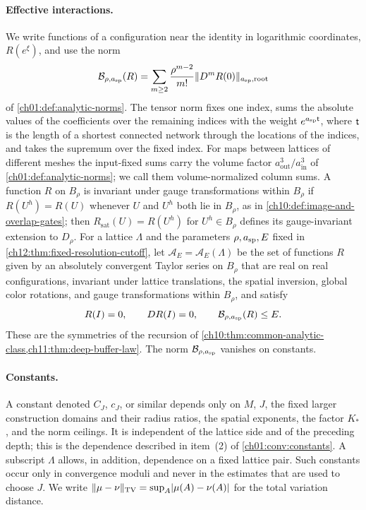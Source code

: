 \paragraph{Effective interactions.}
We write functions of a configuration near the identity in logarithmic coordinates, $R(e^\xi)$, and use the norm
\[
 \mathcal B_{\rho,a_{\mathrm{sp}}}(R)=\sum_{m\ge2}\frac{\rho^{m-2}}{m!}\lVert D^mR(0)\rVert_{a_{\mathrm{sp}},\mathrm{root}}
\]
of \cref{ch01:def:analytic-norms}. The tensor norm fixes one index, sums the absolute values of the coefficients over the remaining indices with the weight $e^{a_{\mathrm{sp}}\mathsf t}$, where $\mathsf t$ is the length of a shortest connected network through the locations of the indices, and takes the supremum over the fixed index. For maps between lattices of different meshes the input-fixed sums carry the volume factor $a_{\mathrm{out}}^3/a_{\mathrm{in}}^3$ of \cref{ch01:def:analytic-norms}; we call them volume-normalized column sums. A function $R$ on $B_\rho$ is invariant under gauge transformations within $B_\rho$ if $R(U^h)=R(U)$ whenever $U$ and $U^h$ both lie in $B_\rho$, as in \cref{ch10:def:image-and-overlap-gates}; then $R_{\mathrm{sat}}(U)=R(U^h)$ for $U^h\in B_\rho$ defines its gauge-invariant extension to $D_\rho$. For a lattice $\Lambda$ and the parameters $\rho,a_{\mathrm{sp}},E$ fixed in \cref{ch12:thm:fixed-resolution-cutoff}, let $\mathcal A_E=\mathcal A_E(\Lambda)$ be the set of functions $R$ given by an absolutely convergent Taylor series on $B_\rho$ that are real on real configurations, invariant under lattice translations, the spatial inversion, global color rotations, and gauge transformations within $B_\rho$, and satisfy
\[
 R(I)=0,\qquad DR(I)=0,\qquad \mathcal B_{\rho,a_{\mathrm{sp}}}(R)\le E .
\]
These are the symmetries of the recursion of \cref{ch10:thm:common-analytic-class,ch11:thm:deep-buffer-law}. The norm $\mathcal B_{\rho,a_{\mathrm{sp}}}$ vanishes on constants.

\paragraph{Constants.}
A constant denoted $C_J$, $c_J$, or similar depends only on $M$, $J$, the fixed larger construction domains and their radius ratios, the spatial exponents, the factor $K_*$, and the norm ceilings. It is independent of the lattice side and of the preceding depth; this is the dependence described in item~(2) of \cref{ch01:conv:constants}. A subscript $\Lambda$ allows, in addition, dependence on a fixed lattice pair. Such constants occur only in convergence moduli and never in the estimates that are used to choose $J$. We write $\lVert \mu-\nu\rVert_{\operatorname{TV}}=\sup_A\lvert \mu(A)-\nu(A)\rvert$ for the total variation distance.

